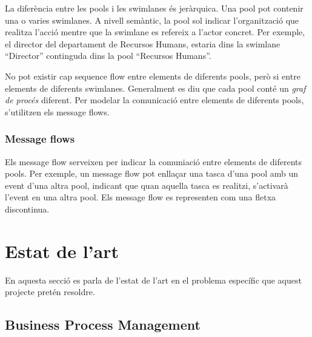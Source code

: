 La diferència entre les pools i les swimlanes és jeràrquica. Una pool pot contenir una o varies swimlanes. A nivell semàntic, la pool sol indicar l'organització que realitza l'acció mentre que la swimlane es refereix a l'actor concret. Per exemple, el director del departament de Recursos Humans, estaria dins la swimlane ``Director'' continguda dins la pool ``Recursos Humans''.

No pot existir cap sequence flow entre elements de diferents pools, però si entre elements de diferents swimlanes. Generalment es diu que cada pool conté un \emph{graf de procés} diferent. Per modelar la comunicació entre elements de diferents pools, s'utilitzen els message flows.

\subsubsection{Message flows}


Els message flow serveixen per indicar la comuniació entre elements de diferents pools. Per exemple, un message flow pot enllaçar una tasca d'una pool amb un event d'una altra pool, indicant que quan aquella tasca es realitzi, s'activarà l'event en una altra pool. Els message flow es representen com una fletxa discontinua.



\section{Estat de l'art}
En aquesta secció es parla de l'estat de l'art en el problema específic que aquest projecte pretén resoldre. 

\subsection{Business Process Management}

